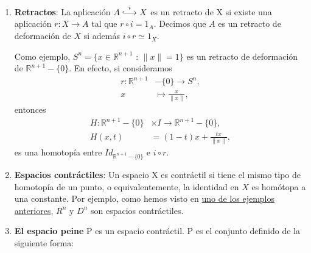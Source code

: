 \begin{ejems}
\begin{enumerate}
\item \label{ej3:ret} \textbf{Retractos}: La aplicación $A \stackrel{i}{\longhookrightarrow} X$
es un retracto de X si existe una aplicación $r : X \longrightarrow A$ tal que $r \circ i = 1_A$.
Decimos que $A$ es un retracto de deformación de $X$ si además $i \circ r \simeq 1_X$.\par
Como ejemplo, $S^n = \{ x \in \mathbb{R}^{n+1}$ : $\| x \| = 1 \}$ es un retracto de deformación de $\mathbb{R}^{n+1} -\{ 0 \}$. En efecto, si consideramos 
\begin{align*}
r : \mathbb{R}^{n+1} &-\{ 0 \} \longrightarrow S^n, \\
x &\longmapsto \frac{x}{\| x \|},
\end{align*}
entonces 
\begin{align*}
H : \mathbb{R}^{n+1} -\{ 0 \} &\times I \longrightarrow \mathbb{R}^{n+1} -\{ 0 \}, \\
H(x, t) &= (1 - t)x + \frac{tx}{\| x \|} ,
\end{align*}
es una homotopía entre $Id_{\mathbb{R}^{n+1} -\{ 0 \}}$ e $i \circ r$.

\item \label{ej3:contr} \textbf{Espacios contráctiles}: Un espacio X es contráctil si tiene el mismo tipo de homotopía de un punto, o equivalentemente, la identidad en $X$ es homótopa a una constante. Por ejemplo, como hemos visto en \hyperlink{ej1:2}{uno de los ejemplos anteriores}, $R^n$ y $D^n$ son espacios contráctiles.

\item \label{ej3:peine} \textbf{El espacio peine} P es un espacio contráctil. P es el conjunto definido de la siguiente forma: 


\end{enumerate}
\end{ejems}
